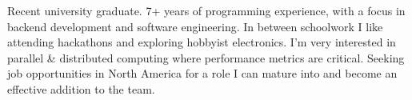 
\begin{cvparagraph}
Recent university graduate. 7+ years of programming experience, with a focus in backend development and software engineering.
In between schoolwork I like attending hackathons and exploring hobbyist electronics.
I'm very interested in parallel \& distributed computing where performance metrics are critical.
Seeking job opportunities in North America for a role I can mature into and become an effective addition to the team.
\end{cvparagraph}